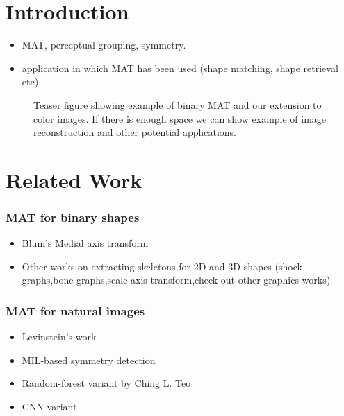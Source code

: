 \documentclass[10pt,twocolumn,letterpaper]{article}
\begin{document}
\section{Introduction}\label{sec:introduction}
\begin{itemize}
\item MAT, perceptual grouping, symmetry.
\item application in which MAT has been used (shape matching, shape retrieval etc)
\end{itemize}

\begin{figure}[!t]
\caption{Teaser figure showing example of binary MAT and our extension to color images.
If there is enough space we can show example of image reconstruction and other potential applications.}
\label{fig:teaser}
\end{figure}

\section{Related Work}\label{sec:related}
\subsubsection*{MAT for binary shapes}
\begin{itemize}
\item Blum's Medial axis transform
\item Other works on extracting skeletons for 2D and 3D shapes (shock graphs,bone graphs,scale axis transform,check out other graphics works)
\end{itemize}
\subsubsection*{MAT for natural images}
\begin{itemize}
\item Levinstein's work
\item MIL-based symmetry detection
\item Random-forest variant by Ching L. Teo
\item CNN-variant 
\end{itemize}
\end{document}
